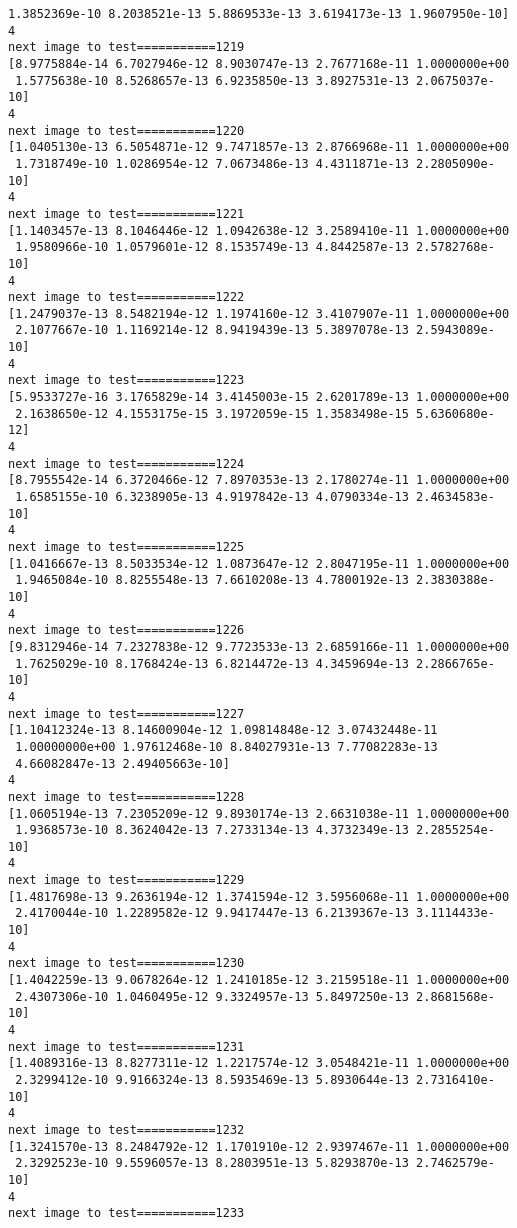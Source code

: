 \documentclass[11pt]{article}
\begin{document}
\begin{Verbatim}[commandchars=\\\{\}]
 1.3852369e-10 8.2038521e-13 5.8869533e-13 3.6194173e-13 1.9607950e-10]
4
next image to test===========1219
[8.9775884e-14 6.7027946e-12 8.9030747e-13 2.7677168e-11 1.0000000e+00
 1.5775638e-10 8.5268657e-13 6.9235850e-13 3.8927531e-13 2.0675037e-10]
4
next image to test===========1220
[1.0405130e-13 6.5054871e-12 9.7471857e-13 2.8766968e-11 1.0000000e+00
 1.7318749e-10 1.0286954e-12 7.0673486e-13 4.4311871e-13 2.2805090e-10]
4
next image to test===========1221
[1.1403457e-13 8.1046446e-12 1.0942638e-12 3.2589410e-11 1.0000000e+00
 1.9580966e-10 1.0579601e-12 8.1535749e-13 4.8442587e-13 2.5782768e-10]
4
next image to test===========1222
[1.2479037e-13 8.5482194e-12 1.1974160e-12 3.4107907e-11 1.0000000e+00
 2.1077667e-10 1.1169214e-12 8.9419439e-13 5.3897078e-13 2.5943089e-10]
4
next image to test===========1223
[5.9533727e-16 3.1765829e-14 3.4145003e-15 2.6201789e-13 1.0000000e+00
 2.1638650e-12 4.1553175e-15 3.1972059e-15 1.3583498e-15 5.6360680e-12]
4
next image to test===========1224
[8.7955542e-14 6.3720466e-12 7.8970353e-13 2.1780274e-11 1.0000000e+00
 1.6585155e-10 6.3238905e-13 4.9197842e-13 4.0790334e-13 2.4634583e-10]
4
next image to test===========1225
[1.0416667e-13 8.5033534e-12 1.0873647e-12 2.8047195e-11 1.0000000e+00
 1.9465084e-10 8.8255548e-13 7.6610208e-13 4.7800192e-13 2.3830388e-10]
4
next image to test===========1226
[9.8312946e-14 7.2327838e-12 9.7723533e-13 2.6859166e-11 1.0000000e+00
 1.7625029e-10 8.1768424e-13 6.8214472e-13 4.3459694e-13 2.2866765e-10]
4
next image to test===========1227
[1.10412324e-13 8.14600904e-12 1.09814848e-12 3.07432448e-11
 1.00000000e+00 1.97612468e-10 8.84027931e-13 7.77082283e-13
 4.66082847e-13 2.49405663e-10]
4
next image to test===========1228
[1.0605194e-13 7.2305209e-12 9.8930174e-13 2.6631038e-11 1.0000000e+00
 1.9368573e-10 8.3624042e-13 7.2733134e-13 4.3732349e-13 2.2855254e-10]
4
next image to test===========1229
[1.4817698e-13 9.2636194e-12 1.3741594e-12 3.5956068e-11 1.0000000e+00
 2.4170044e-10 1.2289582e-12 9.9417447e-13 6.2139367e-13 3.1114433e-10]
4
next image to test===========1230
[1.4042259e-13 9.0678264e-12 1.2410185e-12 3.2159518e-11 1.0000000e+00
 2.4307306e-10 1.0460495e-12 9.3324957e-13 5.8497250e-13 2.8681568e-10]
4
next image to test===========1231
[1.4089316e-13 8.8277311e-12 1.2217574e-12 3.0548421e-11 1.0000000e+00
 2.3299412e-10 9.9166324e-13 8.5935469e-13 5.8930644e-13 2.7316410e-10]
4
next image to test===========1232
[1.3241570e-13 8.2484792e-12 1.1701910e-12 2.9397467e-11 1.0000000e+00
 2.3292523e-10 9.5596057e-13 8.2803951e-13 5.8293870e-13 2.7462579e-10]
4
next image to test===========1233

\end{Verbatim}
\end{document}
